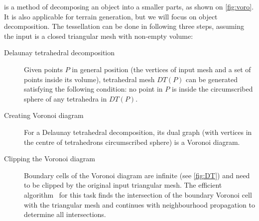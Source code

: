 is a method of decomposing an object into a smaller parts, as shown on \cref{fig:voro}. It is also applicable for \eg terrain generation, but we will focus on object decomposition. The tessellation can be done in following three steps, assuming the input is a closed triangular mesh with non-empty volume:
\begin{description}
    \item[Delaunay tetrahedral decomposition] Given points $P$ in general position (the vertices of input mesh and a set of points inside its volume), tetrahedral mesh $DT(P)$ can be generated satisfying the following condition: no point in $P$ is inside the circumscribed sphere of any tetrahedra in $DT(P)$.
    \item[Creating Voronoi diagram] For a Delaunay tetrahedral decomposition, its dual graph (with vertices in the centre of tetrahedrons circumscribed sphere) is a Voronoi diagram.
    \item[Clipping the Voronoi diagram] Boundary cells of the Voronoi diagram are infinite (see \cref{fig:DT}) and need to be clipped by the original input triangular mesh. The efficient algorithm~\cite{yan2010efficient} for this task finds the intersection of the boundary Voronoi cell with the triangular mesh and continues with neighbourhood propagation to determine all intersections. 
\end{description}

